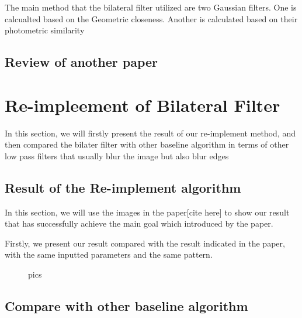 \documentclass[12pt]{article}
\begin{document}
The main method that the bilateral filter utilized are two Gaussian filters. 
One is calcualted based on the Geometric closeness. 
Another is calculated based on their photometric similarity



\subsection{Review of another paper}


\section{Re-impleement of Bilateral Filter}
In this section, we will firstly present the result of our re-implement method, and then compared the bilater filter with other baseline algorithm in terms of other low pass filters that usually blur the image but also blur edges


\subsection{Result of the Re-implement algorithm}
In this section, we will use the images in the paper[cite here] to show our result that has successfully achieve the main goal which introduced by the paper.

Firstly, we present our result compared with the result indicated in the paper, with the same inputted parameters and the same pattern.

\begin{figure}[htbp]
  \centering
  \subfigure[pic1.]{
  \texttt{[image: ]}
  }
  \quad
  \quad
  \quad
  \caption{ pics}
  \end{figure}


\subsection{Compare with other baseline algorithm}
\end{document}

